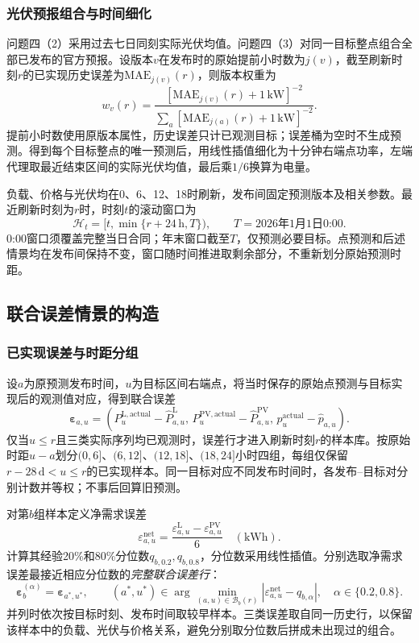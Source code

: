 \subsubsection{光伏预报组合与时间细化}
问题四（2）采用过去七日同刻实际光伏均值。问题四（3）对同一目标整点组合全部已发布的官方预报。设版本$v$在发布时的原始提前小时数为$j(v)$，截至刷新时刻$r$的已实现历史误差为$\mathrm{MAE}_{j(v)}(r)$，则版本权重为
\begin{equation}
 w_v(r)=\frac{[\mathrm{MAE}_{j(v)}(r)+1\,\mathrm{kW}]^{-2}}
 {\sum_a[\mathrm{MAE}_{j(a)}(r)+1\,\mathrm{kW}]^{-2}}.
\end{equation}
提前小时数使用原版本属性，历史误差只计已观测目标；误差桶为空时不生成预测。得到每个目标整点的唯一预测后，用线性插值细化为十分钟右端点功率，左端代理取最近结束区间的实际光伏均值，最后乘$1/6$换算为电量。

负载、价格与光伏均在0、6、12、18时刷新，发布间固定预测版本及相关参数。最近刷新时刻为$r$时，时刻$t$的滚动窗口为
\begin{equation}
 \mathcal H_t=[t,\min\{r+24\,\mathrm h,T\}),\qquad T=\text{2026年1月1日0:00}.
\end{equation}
0:00窗口须覆盖完整当日合同；年末窗口截至$T$，仅预测必要目标。点预测和后述情景均在发布间保持不变，窗口随时间推进取剩余部分，不重新划分原始预测时距。

\subsection{联合误差情景的构造}
\subsubsection{已实现误差与时距分组}
设$a$为原预测发布时间，$u$为目标区间右端点，将当时保存的原始点预测与目标实现后的观测值对应，得到联合误差
\begin{equation}
 \boldsymbol\varepsilon_{a,u}=\left(
 P_u^{\mathrm{L,actual}}-\widehat P_{a,u}^{\mathrm L},\,
 P_u^{\mathrm{PV,actual}}-\widehat P_{a,u}^{\mathrm{PV}},\,
 p_u^{\mathrm{actual}}-\widehat p_{a,u}\right).
\end{equation}
仅当$u\le r$且三类实际序列均已观测时，误差行才进入刷新时刻$r$的样本库。按原始时距$u-a$划分$(0,6]$、$(6,12]$、$(12,18]$、$(18,24]$小时四组，每组仅保留$r-28\,\mathrm d<u\le r$的已实现样本。同一目标对应不同发布时间时，各发布--目标对分别计数并等权；不事后回算旧预测。

对第$b$组样本定义净需求误差
\begin{equation}
 \varepsilon_{a,u}^{\mathrm{net}}
 =\frac{\varepsilon_{a,u}^{\mathrm L}-\varepsilon_{a,u}^{\mathrm{PV}}}{6}
 \quad (\mathrm{kWh}).
\end{equation}
计算其经验20\%和80\%分位数$q_{b,0.2},q_{b,0.8}$，分位数采用线性插值。分别选取净需求误差最接近相应分位数的\emph{完整联合误差行}：
\begin{equation}
 \boldsymbol\varepsilon_b^{(\alpha)}
 =\boldsymbol\varepsilon_{a^*,u^*},\qquad
 (a^*,u^*)\in\arg\min_{(a,u)\in\mathcal B_b(r)}
 \left|\varepsilon_{a,u}^{\mathrm{net}}-q_{b,\alpha}\right|,
 \quad\alpha\in\{0.2,0.8\}.
\end{equation}
并列时依次按目标时刻、发布时间取较早样本。三类误差取自同一历史行，以保留该样本中的负载、光伏与价格关系，避免分别取分位数后拼成未出现过的组合。

